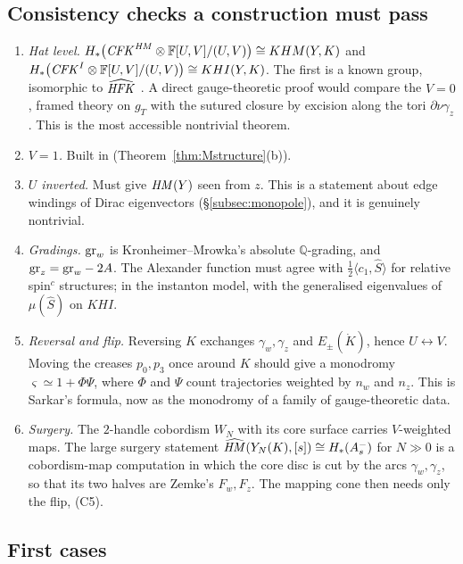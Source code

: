 \subsection{Consistency checks a construction must pass}
\begin{enumerate}[label=(C\arabic*),leftmargin=2.6em]
\item \emph{Hat level.}  $H_*\big(\mathit{CFK}^{\mathit{HM}}\otimes\mathbb{F}[U,V]/(U,V)\big)\cong KHM(Y,K)$ and
$H_*\big(\mathit{CFK}^{I}\otimes\mathbb{F}[U,V]/(U,V)\big)\cong KHI(Y,K)$.  The first is a known group, isomorphic to $\widehat{\mathit{HFK}}$
\cite{Lekili,BS-equiv,CGH-sutured}.  A direct gauge-theoretic proof would compare the $V=0$, framed theory on $g_T$ with the
sutured closure by excision along the tori $\partial\nu\gamma_z$.  This is the most accessible nontrivial theorem.
\item \emph{$V=1$.}  Built in (Theorem~\ref{thm:Mstructure}(b)).
\item \emph{$U$ inverted.}  Must give $\mathit{HM}(Y)$ seen from $z$.  This is a statement about edge windings of Dirac
eigenvectors (\S\ref{subsec:monopole}), and it is genuinely nontrivial.
\item \emph{Gradings.}  $\mathrm{gr}_w$ is Kronheimer--Mrowka's absolute $\mathbb Q$-grading, and $\mathrm{gr}_z=\mathrm{gr}_w-2A$.  The Alexander function
must agree with $\frac12\langle c_1,\hat S\rangle$ for relative spin$^c$ structures; in the instanton model, with the generalised
eigenvalues of $\mu(\hat S)$ on $KHI$.
\item \emph{Reversal and flip.}  Reversing $K$ exchanges $\gamma_w,\gamma_z$ and $E_\pm(\dot K)$, hence $U\leftrightarrow V$.  Moving the creases
$p_0,p_3$ once around $K$ should give a monodromy $\varsigma\simeq1+\Phi\Psi$, where $\Phi$ and $\Psi$ count trajectories weighted by
$n_w$ and $n_z$.  This is Sarkar's formula, now as the monodromy of a family of gauge-theoretic data.
\item \emph{Surgery.}  The $2$-handle cobordism $W_N$ with its core surface carries $V$-weighted maps.  The large surgery
statement $\widehat{\mathit{HM}}(Y_N(K),[s])\cong H_*(A^-_s)$ for $N\gg0$ is a cobordism-map computation in which the core disc is cut by
the arcs $\gamma_w,\gamma_z$, so that its two halves are Zemke's $F_w,F_z$.  The mapping cone then needs only the flip, (C5).
\end{enumerate}

\subsection{First cases}

